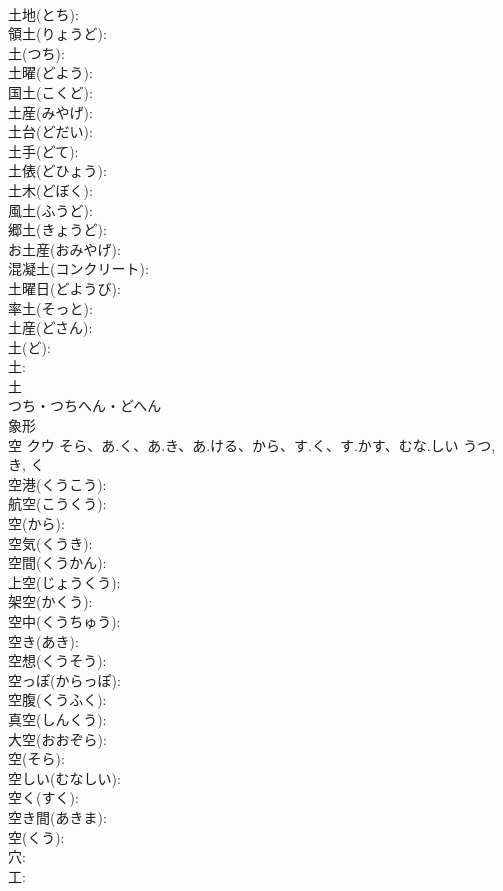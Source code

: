 \documentclass[8pt]{extreport}
\begin{document}
\begin{CJK}{UTF8}{min}
\\	土地(とち): 
\\	領土(りょうど): 
\\	土(つち): 
\\	土曜(どよう): 
\\	国土(こくど): 
\\	土産(みやげ): 
\\	土台(どだい): 
\\	土手(どて): 
\\	土俵(どひょう): 
\\	土木(どぼく): 
\\	風土(ふうど): 
\\	郷土(きょうど): 
\\	お土産(おみやげ): 
\\	混凝土(コンクリート): 
\\	土曜日(どようび): 
\\	率土(そっと): 
\\	土産(どさん): 
\\	土(ど): 
\\	土: 
\\	土	
\\	つち・つちへん・どへん	
\\	象形 
\\	空	クウ	そら、あ.く、あ.き、あ.ける、から、す.く、す.かす、むな.しい	うつ, き, く	
\\	空港(くうこう): 
\\	航空(こうくう): 
\\	空(から): 
\\	空気(くうき): 
\\	空間(くうかん): 
\\	上空(じょうくう): 
\\	架空(かくう): 
\\	空中(くうちゅう): 
\\	空き(あき): 
\\	空想(くうそう): 
\\	空っぽ(からっぽ): 
\\	空腹(くうふく): 
\\	真空(しんくう): 
\\	大空(おおぞら): 
\\	空(そら): 
\\	空しい(むなしい): 
\\	空く(すく): 
\\	空き間(あきま): 
\\	空(くう): 
\\	穴: 
\\	工: 

\end{CJK}
\end{document}
